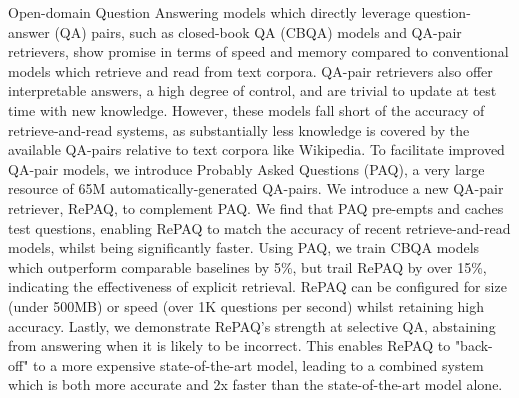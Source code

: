 Open-domain Question Answering models which directly leverage question-answer (QA) pairs, such as closed-book QA (CBQA) models and QA-pair retrievers, show promise in terms of speed and memory compared to conventional models which retrieve and read from text corpora. QA-pair retrievers also offer interpretable answers, a high degree of control, and are trivial to update at test time with new knowledge. However, these models fall short of the accuracy of retrieve-and-read systems, as substantially less knowledge is covered by the available QA-pairs relative to text corpora like Wikipedia. To facilitate improved QA-pair models, we introduce Probably Asked Questions (PAQ), a very large resource of 65M automatically-generated QA-pairs. We introduce a new QA-pair retriever, RePAQ, to complement PAQ. We find that PAQ pre-empts and caches test questions, enabling RePAQ to match the accuracy of recent retrieve-and-read models, whilst being significantly faster. Using PAQ, we train CBQA models which outperform comparable baselines by 5\%, but trail RePAQ by over 15\%, indicating the effectiveness of explicit retrieval. RePAQ can be configured for size (under 500MB) or speed (over 1K questions per second) whilst retaining high accuracy. Lastly, we demonstrate RePAQ's strength at selective QA, abstaining from answering when it is likely to be incorrect. This enables RePAQ to "back-off" to a more expensive state-of-the-art model, leading to a combined system which is both more accurate and 2x faster than the state-of-the-art model alone.